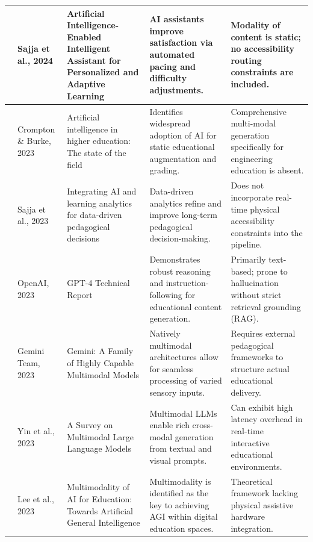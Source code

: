 \begin{longtable}{|p{1.2cm}|p{2.8cm}|p{4.2cm}|p{4.0cm}|p{3.8cm}|}
	\cite{tan2025} & Sajja et al., 2024 & Artificial Intelligence-Enabled Intelligent Assistant for Personalized and Adaptive Learning & AI assistants improve satisfaction via automated pacing and difficulty adjustments. & Modality of content is static; no accessibility routing constraints are included. \\
	\hline
	
	\cite{merino2025} & Crompton \& Burke, 2023 & Artificial intelligence in higher education: The state of the field & Identifies widespread adoption of AI for static educational augmentation and grading. & Comprehensive multi-modal generation specifically for engineering education is absent. \\
	\hline
	
	\cite{search35_sajja2025} & Sajja et al., 2023 & Integrating AI and learning analytics for data-driven pedagogical decisions & Data-driven analytics refine and improve long-term pedagogical decision-making. & Does not incorporate real-time physical accessibility constraints into the pipeline. \\
	\hline
	
	\cite{openai2023gpt4} & OpenAI, 2023 & GPT-4 Technical Report & Demonstrates robust reasoning and instruction-following for educational content generation. & Primarily text-based; prone to hallucination without strict retrieval grounding (RAG). \\
	\hline
	
	\cite{google2023gemini} & Gemini Team, 2023 & Gemini: A Family of Highly Capable Multimodal Models & Natively multimodal architectures allow for seamless processing of varied sensory inputs. & Requires external pedagogical frameworks to structure actual educational delivery. \\
	\hline
	
	\cite{liu2024multimodal} & Yin et al., 2023 & A Survey on Multimodal Large Language Models & Multimodal LLMs enable rich cross-modal generation from textual and visual prompts. & Can exhibit high latency overhead in real-time interactive educational environments. \\
	\hline
	
	\cite{zhai2023multimodal} & Lee et al., 2023 & Multimodality of AI for Education: Towards Artificial General Intelligence & Multimodality is identified as the key to achieving AGI within digital education spaces. & Theoretical framework lacking physical assistive hardware integration. \\
	\hline
	

\end{longtable}
